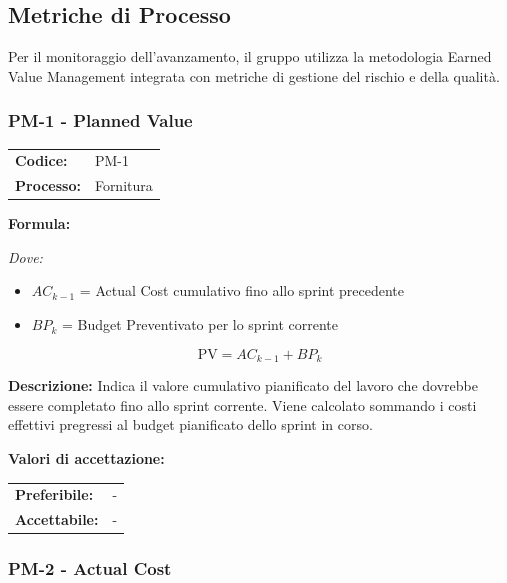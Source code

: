 \documentclass[a4paper,11pt,oneside]{scrartcl}
\begin{document}
\subsection{Metriche di Processo}
Per il monitoraggio dell'avanzamento, il gruppo utilizza la metodologia Earned Value Management{\scriptsize{}} integrata con metriche di gestione del rischio e della qualità.

\subsubsection{PM-1 - Planned Value}

\noindent
\begin{tabular}{@{}p{}p{}@{}}
\textbf{Codice:} & PM-1 \\
\textbf{Processo:} & Fornitura \\
\end{tabular}

\vspace{0.3cm}
\noindent\textbf{Formula:}

\noindent\textit{Dove:}
\begin{itemize}[leftmargin=1.5cm, topsep=0pt, itemsep=0pt]
    \item $AC_{k-1}$ = Actual Cost cumulativo fino allo sprint{\scriptsize{}} precedente
    \item $BP_k$ = Budget Preventivato per lo sprint corrente
\end{itemize}

\[
\text{PV} = AC_{k-1} + BP_k
\]

\noindent\textbf{Descrizione:} Indica il valore cumulativo pianificato del lavoro che dovrebbe essere completato fino allo sprint corrente. Viene calcolato sommando i costi effettivi pregressi al budget pianificato dello sprint in corso.

\vspace{0.2cm}
\noindent\textbf{Valori di accettazione:}
\vspace{0.1cm}

\noindent
\begin{tabular}{@{}ll@{}}
\textbf{Preferibile:} & - \\
\textbf{Accettabile:} & - \\
\end{tabular}

\subsubsection{PM-2 - Actual Cost}
\end{document}
